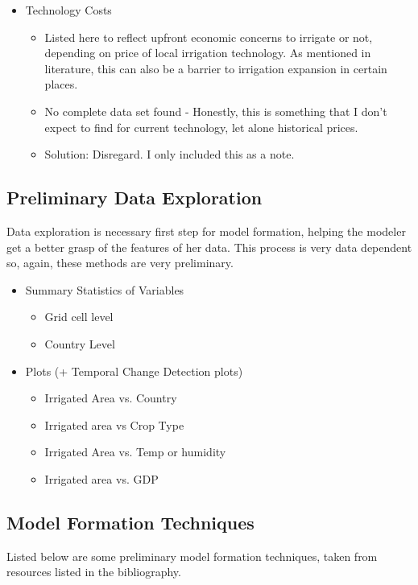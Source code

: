 \documentclass[12pt]{extarticle}
\begin{document}
\begin{itemize}
   \item Technology Costs
   \begin{itemize}
   \item Listed here to reflect upfront economic concerns to irrigate or not, depending on price of local irrigation technology. As mentioned in literature, this can also be a barrier to irrigation expansion in certain places.
     \item No complete data set found - Honestly, this is something that I don't expect to find for current technology, let alone historical prices. 
     \item Solution: Disregard. I only included this as a note. 
       \end{itemize}
     \end{itemize}   

\subsection{Preliminary Data Exploration}
Data exploration is necessary first step for model formation, helping the modeler get a better grasp of the features of her data. This process is very data dependent so, again, these methods are very preliminary. 
\begin{itemize}
   \item Summary Statistics of Variables
   \begin{itemize}
     \item Grid cell level
    \item Country Level
       \end{itemize}
     \end{itemize}   
\begin{itemize}
   \item Plots (+ Temporal Change Detection plots)
   \begin{itemize}
     \item Irrigated Area vs. Country
     \item Irrigated area vs Crop Type
     \item Irrigated Area vs. Temp or humidity 
     \item Irrigated area vs. GDP
       \end{itemize}
     \end{itemize}   
     
\subsection{Model Formation Techniques}
Listed below are some preliminary model formation techniques, taken from resources listed in the bibliography. 
\end{document}
